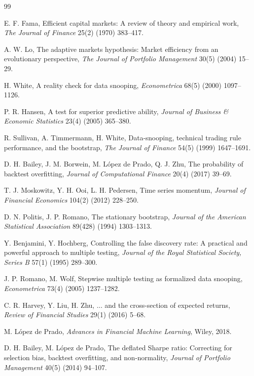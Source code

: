 \documentclass[preprint,12pt]{elsarticle}
\theoremstyle{definition}
\begin{document}
\begin{thebibliography}{99}

E. F. Fama, Efficient capital markets: A review of theory and empirical work,
\emph{The Journal of Finance} 25(2) (1970) 383--417.

A. W. Lo, The adaptive markets hypothesis: Market efficiency from an evolutionary perspective,
\emph{The Journal of Portfolio Management} 30(5) (2004) 15--29.

H. White, A reality check for data snooping,
\emph{Econometrica} 68(5) (2000) 1097--1126.

P. R. Hansen, A test for superior predictive ability,
\emph{Journal of Business \& Economic Statistics} 23(4) (2005) 365--380.

R. Sullivan, A. Timmermann, H. White, Data-snooping, technical trading rule performance, and the bootstrap,
\emph{The Journal of Finance} 54(5) (1999) 1647--1691.

D. H. Bailey, J. M. Borwein, M. L\'opez de Prado, Q. J. Zhu,
The probability of backtest overfitting,
\emph{Journal of Computational Finance} 20(4) (2017) 39--69.

T. J. Moskowitz, Y. H. Ooi, L. H. Pedersen, Time series momentum,
\emph{Journal of Financial Economics} 104(2) (2012) 228--250.

D. N. Politis, J. P. Romano, The stationary bootstrap,
\emph{Journal of the American Statistical Association} 89(428) (1994) 1303--1313.

Y. Benjamini, Y. Hochberg, Controlling the false discovery rate: A practical and powerful approach to multiple testing,
\emph{Journal of the Royal Statistical Society, Series B} 57(1) (1995) 289--300.

J. P. Romano, M. Wolf, Stepwise multiple testing as formalized data snooping,
\emph{Econometrica} 73(4) (2005) 1237--1282.

C. R. Harvey, Y. Liu, H. Zhu, $\ldots$ and the cross-section of expected returns,
\emph{Review of Financial Studies} 29(1) (2016) 5--68.

M. L\'opez de Prado, \emph{Advances in Financial Machine Learning}, Wiley, 2018.

D. H. Bailey, M. L\'opez de Prado, The deflated Sharpe ratio: Correcting for selection bias, backtest overfitting, and non-normality,
\emph{Journal of Portfolio Management} 40(5) (2014) 94--107.


\end{thebibliography}
\end{document}
